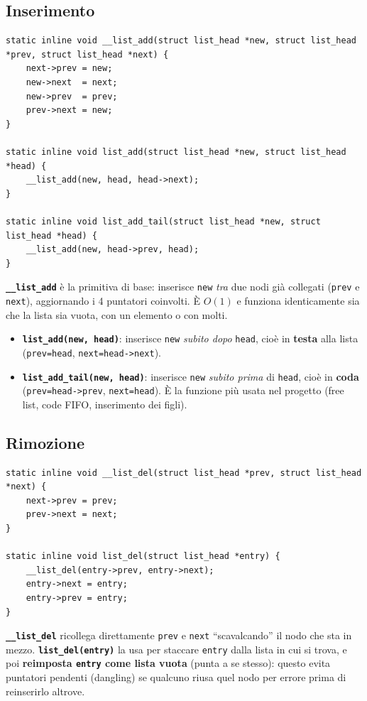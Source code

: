 \documentclass[11pt,a4paper]{article}
\newcommand{\code}[1]{\texttt{#1}}
\newcommand{\func}[1]{\textbf{\texttt{#1}}}
\begin{document}
\subsection{Inserimento}
\begin{lstlisting}
static inline void __list_add(struct list_head *new, struct list_head *prev, struct list_head *next) {
    next->prev = new;
    new->next  = next;
    new->prev  = prev;
    prev->next = new;
}

static inline void list_add(struct list_head *new, struct list_head *head) {
    __list_add(new, head, head->next);
}

static inline void list_add_tail(struct list_head *new, struct list_head *head) {
    __list_add(new, head->prev, head);
}
\end{lstlisting}
\func{\_\_list\_add} è la primitiva di base: inserisce \code{new} \emph{tra}
due nodi già collegati (\code{prev} e \code{next}), aggiornando i 4
puntatori coinvolti. È $O(1)$ e funziona identicamente sia che la lista sia
vuota, con un elemento o con molti.
\begin{itemize}
\item \func{list\_add(new, head)}: inserisce \code{new} \emph{subito dopo}
  \code{head}, cioè in \textbf{testa} alla lista (\code{prev=head},
  \code{next=head->next}).
\item \func{list\_add\_tail(new, head)}: inserisce \code{new} \emph{subito
  prima} di \code{head}, cioè in \textbf{coda} (\code{prev=head->prev},
  \code{next=head}). È la funzione più usata nel progetto (free list, code
  FIFO, inserimento dei figli).
\end{itemize}

\subsection{Rimozione}
\begin{lstlisting}
static inline void __list_del(struct list_head *prev, struct list_head *next) {
    next->prev = prev;
    prev->next = next;
}

static inline void list_del(struct list_head *entry) {
    __list_del(entry->prev, entry->next);
    entry->next = entry;
    entry->prev = entry;
}
\end{lstlisting}
\func{\_\_list\_del} ricollega direttamente \code{prev} e \code{next}
``scavalcando'' il nodo che sta in mezzo. \func{list\_del(entry)} la usa per
staccare \code{entry} dalla lista in cui si trova, e poi
\textbf{reimposta \code{entry} come lista vuota} (punta a se stesso): questo
evita puntatori pendenti (dangling) se qualcuno riusa quel nodo per
errore prima di reinserirlo altrove.
\end{document}
